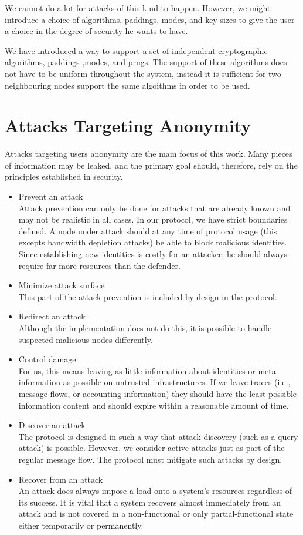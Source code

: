 We cannot do a lot for attacks of this kind to happen. However, we might introduce a choice of algorithms, paddings, modes, and key sizes to give the user a choice in the degree of security he wants to have.

We have introduced a way to support a set of independent cryptographic algorithms, paddings ,modes, and prngs. The support of these algorithms does not have to be uniform throughout the system, instead it is sufficient for two neighbouring nodes support the same algoithms in order to be used. 

\section{Attacks Targeting Anonymity}
Attacks targeting users anonymity are the main focus of this work. Many pieces of information may be leaked, and the primary goal should, therefore, rely on the principles established in security.

\begin{itemize}
	\item Prevent an attack\\
	Attack prevention can only be done for attacks that are already known and may not be realistic in all cases. In our protocol, we have strict boundaries defined. A node under attack should at any time of protocol usage (this excepts bandwidth depletion attacks) be able to block malicious identities. Since establishing new identities is costly for an attacker, he should always require far more resources than the defender.
	\item Minimize attack surface\\
	This part of the attack prevention is included by design in the protocol.
	\item Redirect an attack\\
	Although the implementation does not do this, it is possible to handle suspected malicious nodes differently.
	\item Control damage\\
	For us, this means leaving as little information about identities or meta information as possible on untrusted infrastructures. If we leave traces (i.e., message flows, or accounting information) they should have the least possible information content and should expire within a reasonable amount of time.
	\item Discover an attack\\
	The protocol is designed in such a way that attack discovery (such as a query attack) is possible. However, we consider active attacks just as part of the regular message flow. The protocol must mitigate such attacks by design.
	\item Recover from an attack\\
	An attack does always impose a load onto a system's resources regardless of its success. It is vital that a system recovers almost immediately from an attack and is not covered in a non-functional or only partial-functional state either temporarily or permanently.
\end{itemize}

